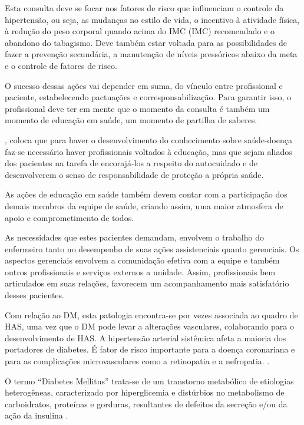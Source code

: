 Esta consulta deve se focar nos fatores de risco que influenciam o controle da hipertensão, ou seja, as mudanças no estilo de vida, o incentivo à atividade física, à redução do peso corporal quando acima do \acrlong{IMC} (\acrshort{IMC}) recomendado e o abandono do tabagismo. Deve também estar voltada para as possibilidades de fazer a prevenção secundária, a manutenção de níveis pressóricos abaixo da meta e o controle de fatores de risco.

O sucesso dessas ações vai depender em suma, do vínculo entre profissional e paciente, estabelecendo pactuações e corresponsabilização. Para garantir isso, o profissional deve ter em mente que o momento da consulta é também um momento de educação em saúde, um momento de partilha de saberes.

\cite{santos2012adesao}, coloca que para haver o desenvolvimento do conhecimento sobre saúde-doença faz-se necessário haver profissionais voltados à educação, mas que sejam aliados dos pacientes na tarefa de encorajá-los a respeito do autocuidado e de desenvolverem o senso de responsabilidade de proteção a própria saúde. 

As ações de educação em saúde também devem contar com a participação dos demais membros da equipe de saúde, criando assim, uma maior atmosfera de apoio e comprometimento de todos. 

As necessidades que estes pacientes demandam, envolvem o trabalho do enfermeiro tanto no desempenho de suas ações assistenciais quanto gerenciais. Os aspectos gerenciais envolvem a comunidação efetiva com a equipe e também outros profissionais e serviços externos a unidade. Assim, profissionais bem articulados em suas relações, favorecem um acompanhamento mais satisfatório desses pacientes. 

Com relação ao \acrlong{DM}, esta patologia encontra-se por vezes associada ao quadro de HAS, uma vez que o DM pode levar a alterações vasculares, colaborando para o desenvolvimento de HAS. A hipertensão arterial sistêmica afeta a maioria dos portadores de diabetes. É fator de risco importante para a doença coronariana e para as complicações microvasculares como a retinopatia e a nefropatia. \cite{atencaobasica16}.

O termo ``Diabetes Mellitus'' trata-se de um transtorno metabólico de etiologias heterogêneas, caracterizado por hiperglicemia e distúrbios no metabolismo de carboidratos, proteínas e gorduras, resultantes de defeitos da secreção e/ou da ação da insulina \cite{assal1999definition}.

